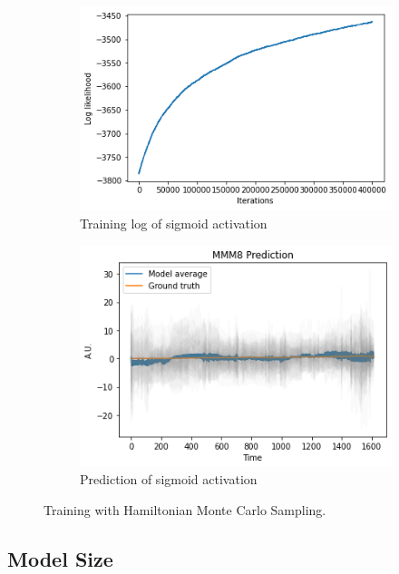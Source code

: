 \documentclass{article}
\begin{document}
\begin{figure}[h]
    \centering
    \begin{subfigure}[b]{0.5\textwidth}
        \centering
        \includegraphics[width=\textwidth]{../img/training_HMC_400000_iter.png}
        \caption{Training log of sigmoid activation}
    \end{subfigure}\hfill
    \begin{subfigure}[b]{0.5\textwidth}
        \centering
        \includegraphics[trim={0 0 0 0.7cm}, clip, width=\textwidth]{../img/prediction_HMC_400000_iter.png}
        \caption{Prediction of sigmoid activation}
    \end{subfigure}
    \caption{Training with Hamiltonian Monte Carlo Sampling.}
\end{figure}

\subsection{Model Size}
 
\end{document}

